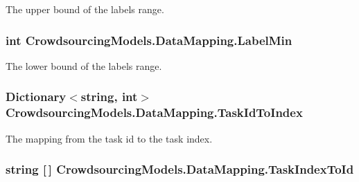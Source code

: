 The upper bound of the labels range. 

\hypertarget{class_crowdsourcing_models_1_1_data_mapping_ae3668cab21dd19e556898ead95378b38}{}
\subsubsection[{Label\+Min}]{\setlength{\rightskip}{0pt plus 5cm}int Crowdsourcing\+Models.\+Data\+Mapping.\+Label\+Min}\label{class_crowdsourcing_models_1_1_data_mapping_ae3668cab21dd19e556898ead95378b38}


The lower bound of the labels range. 

\hypertarget{class_crowdsourcing_models_1_1_data_mapping_a1c4dfca839294c04a199fd9b87c51866}{}
\subsubsection[{Task\+Id\+To\+Index}]{\setlength{\rightskip}{0pt plus 5cm}Dictionary$<$string, int$>$ Crowdsourcing\+Models.\+Data\+Mapping.\+Task\+Id\+To\+Index}\label{class_crowdsourcing_models_1_1_data_mapping_a1c4dfca839294c04a199fd9b87c51866}


The mapping from the task id to the task index. 

\hypertarget{class_crowdsourcing_models_1_1_data_mapping_ae4da6289f06e9d087ce8b3c7458308ba}{}
\subsubsection[{Task\+Index\+To\+Id}]{\setlength{\rightskip}{0pt plus 5cm}string \mbox{[}$\,$\mbox{]} Crowdsourcing\+Models.\+Data\+Mapping.\+Task\+Index\+To\+Id}\label{class_crowdsourcing_models_1_1_data_mapping_ae4da6289f06e9d087ce8b3c7458308ba}


